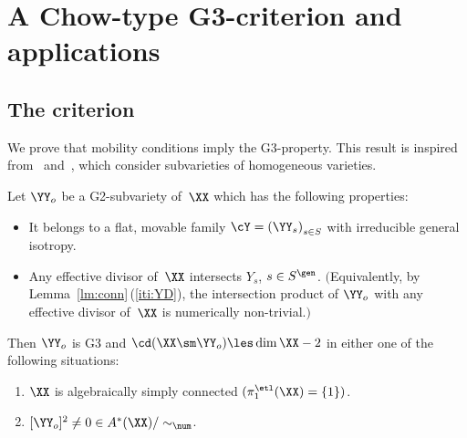 \section{A Chow-type G3-criterion and applications}\label{sct:chow}

\subsection{The criterion} 
We prove that mobility conditions imply the G3-property. This result is inspired from~\cite{chow} and~\cite[Theorem 13.4]{bad}, which consider subvarieties of homogeneous varieties.

\begin{m-theorem} \label{thm:g3}
Let $\YY_o$ be a G2-subvariety of\, $\XX$ which has the following properties: 
\begin{itemize}[leftmargin=3ex]
\item It belongs to a flat, movable family $\cY={(\YY_s)}_{s\in S}$ with irreducible general isotropy. 
\item Any effective divisor of\, $\XX$ intersects $Y_s$, $s\in S^\gen$. $($Equivalently, by Lemma~\ref{lm:conn}\,{\rm(\ref{iti:YD})}, the intersection product of $\YY_o$ with any effective divisor of\, $\XX$ is numerically non-trivial.$)$
\end{itemize}
Then $\YY_o$ is G3 and $\cd(\XX\sm\YY_o)\les\dim\XX-2$ in either one of the following situations:
\begin{enumerate}
\item\label{thm:g3-1} $\XX$ is algebraically simply connected $(\pi_1^\etl(\XX)=\{1\})$.
\item\label{thm:g3-2} $[\YY_o]^2\neq0\in A^*(\XX)/\sim_{\num}$.  
\end{enumerate}
\end{m-theorem}

